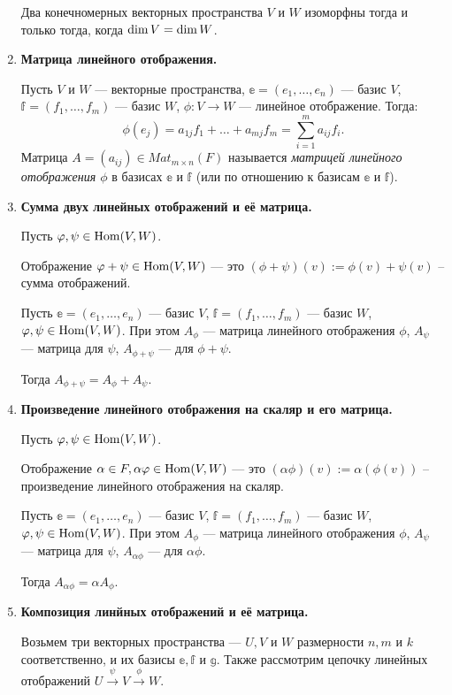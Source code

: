 \begin{enumerate}
Два конечномерных векторных пространства $V$ и $W$ изоморфны тогда и только тогда, когда $\dim V \hm= \dim W$.
\item \textbf{Матрица линейного отображения.}

Пусть $V$ и $W$ --- векторные пространства, $\mathbb{e} = (e_1, \ldots, e_n)$ --- базис $V$, $\mathbb{f} = (f_1, \ldots, f_m)$ --- базис $W$, $\phi: V \rightarrow W$ --- линейное отображение. Тогда:
\[
\phi(e_j) = a_{1j}f_1 + \ldots + a_{mj}f_m = \sum_{i = 1}^{m}a_{ij}f_i.
\]
Матрица $A = (a_{ij}) \in Mat_{m \times n}(F)$ называется \textit{матрицей линейного отображения $\phi$} в базисах $\mathbb{e}$ и $\mathbb{f}$ (или по отношению к базисам $\mathbb{e}$ и $\mathbb{f}$).
\item \textbf{Сумма двух линейных отображений и её матрица.}

Пусть $\varphi, \psi \in \mathrm{Hom}(V, W)$.

Отображение $\varphi + \psi \in \mathrm{Hom}(V, W)$ --- это $(\phi + \psi)(v):= \phi(v) + \psi(v)$ -- сумма отображений.

Пусть $\mathbb{e} = (e_1, \ldots, e_n)$ --- базис $V$, $\mathbb{f} = (f_1, \ldots, f_m)$ --- базис $W$, $\varphi, \psi \in \mathrm{Hom}(V, W)$. При этом $A_{\phi}$ --- матрица линейного отображения $\phi$, $A_{\psi}$ --- матрица для $\psi$, $A_{\phi+\psi}$ --- для $\phi + \psi$.

Тогда $A_{\phi+\psi} = A_{\phi} + A_{\psi}$.
\item \textbf{Произведение линейного отображения на скаляр и его матрица.}

Пусть $\varphi, \psi \in \mathrm{Hom}(V, W)$.

Отображение $\alpha \in F, \alpha\varphi \in \mathrm{Hom}(V, W)$ --- это $(\alpha\phi)(v) := \alpha(\phi(v))$ -- произведение линейного отображения на скаляр.

Пусть $\mathbb{e} = (e_1, \ldots, e_n)$ --- базис $V$, $\mathbb{f} = (f_1, \ldots, f_m)$ --- базис $W$, $\varphi, \psi \in \mathrm{Hom}(V, W)$. При этом $A_{\phi}$ --- матрица линейного отображения $\phi$, $A_{\psi}$ --- матрица для $\psi$,  $A_{\alpha\phi}$ --- для $\alpha\phi$.

Тогда $A_{\alpha\phi} = \alpha A_{\phi}$.
\item \textbf{Композиция линйных отображений и её матрица.}

Возьмем три векторных пространства --- $U, V$ и $W$ размерности $n, m$ и $k$ соответственно, и их базисы $\mathbb{e}, \mathbb{f}$ и $\mathbb{g}$. Также рассмотрим цепочку линейных отображений $U \xrightarrow{\psi} V \xrightarrow{\phi} W$. 


\end{enumerate}
